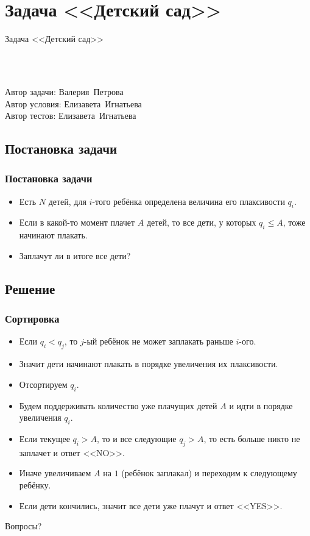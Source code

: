 \section{Задача <<Детский сад>>}


\begin{frame}
    \begin{center}
        \Huge Задача <<Детский сад>>
    \end{center}
    ~\\~\\
    \begin{center}
        Автор задачи: Валерия~Петрова\\
        Автор условия: Елизавета~Игнатьева\\
        Автор тестов: Елизавета~Игнатьева
    \end{center}
\end{frame}

\subsection{Постановка задачи}

\begin{frame}
    \frametitle{Постановка задачи}

    \begin{itemize}
        \item Есть $N$ детей, для $i$-того ребёнка определена величина его плаксивости $q_i$.
        \item Если в какой-то момент плачет $A$ детей, то все дети, у которых $q_i \le A$, тоже начинают плакать.
        \item Заплачут ли в итоге все дети?
    \end{itemize}
\end{frame}

\subsection{Решение}

\begin{frame}
    \frametitle{Сортировка}

    \begin{itemize}
        \item Если $q_i < q_j$, то $j$-ый ребёнок не может заплакать раньше $i$-ого.
        \item Значит дети начинают плакать в порядке увеличения их плаксивости.
        \item Отсортируем $q_i$.
        \item Будем поддерживать количество уже плачущих детей $A$ и идти в порядке увеличения $q_i$.
        \item Если текущее $q_i > A$, то и все следующие $q_j > A$, то есть больше никто не заплачет и ответ <<NO>>.
        \item Иначе увеличиваем $A$ на $1$ (ребёнок заплакал) и переходим к следующему ребёнку.
        \item Если дети кончились, значит все дети уже плачут и ответ <<YES>>.
    \end{itemize}
\end{frame}

\begin{frame}
    \begin{center}
        \Huge Вопросы?
    \end{center}
\end{frame}

